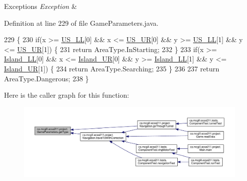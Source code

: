 \begin{DoxyExceptions}{Exceptions}
{\em Exception} & \\
\hline
\end{DoxyExceptions}


Definition at line 229 of file Game\+Parameters.\+java.


\begin{DoxyCode}
229                                               \{
230     \textcolor{keywordflow}{if}(x >= \hyperlink{enumca_1_1mcgill_1_1ecse211_1_1project_1_1_game_parameters_a4b437dfb1ca3a0898631dfd670828202}{US\_LL}[0] && x <= \hyperlink{enumca_1_1mcgill_1_1ecse211_1_1project_1_1_game_parameters_ab53ad7cced40d028fd0bbc3472cd2f8d}{US\_UR}[0] && y >= \hyperlink{enumca_1_1mcgill_1_1ecse211_1_1project_1_1_game_parameters_a4b437dfb1ca3a0898631dfd670828202}{US\_LL}[1] && y <= 
      \hyperlink{enumca_1_1mcgill_1_1ecse211_1_1project_1_1_game_parameters_ab53ad7cced40d028fd0bbc3472cd2f8d}{US\_UR}[1]) \{
231       \textcolor{keywordflow}{return} AreaType.InStarting;
232     \}
233     \textcolor{keywordflow}{if}(x >= \hyperlink{enumca_1_1mcgill_1_1ecse211_1_1project_1_1_game_parameters_a70576bc98218fc0b4a7b2d3b2d56ed2b}{Island\_LL}[0] && x <= \hyperlink{enumca_1_1mcgill_1_1ecse211_1_1project_1_1_game_parameters_ac442a5d4a39d6ffae29a183eca5934d3}{Island\_UR}[0] && y >= 
      \hyperlink{enumca_1_1mcgill_1_1ecse211_1_1project_1_1_game_parameters_a70576bc98218fc0b4a7b2d3b2d56ed2b}{Island\_LL}[1] && y <= \hyperlink{enumca_1_1mcgill_1_1ecse211_1_1project_1_1_game_parameters_ac442a5d4a39d6ffae29a183eca5934d3}{Island\_UR}[1]) \{
234       \textcolor{keywordflow}{return} AreaType.Searching;
235     \}
236     
237     \textcolor{keywordflow}{return} AreaType.Dangerous;
238   \}
\end{DoxyCode}
Here is the caller graph for this function\+:\nopagebreak
\begin{figure}[H]
\begin{center}
\leavevmode
\includegraphics[width=350pt]{enumca_1_1mcgill_1_1ecse211_1_1project_1_1_game_parameters_a4e7713b30588fc0b2af065db0b198b2c_icgraph}
\end{center}
\end{figure}


